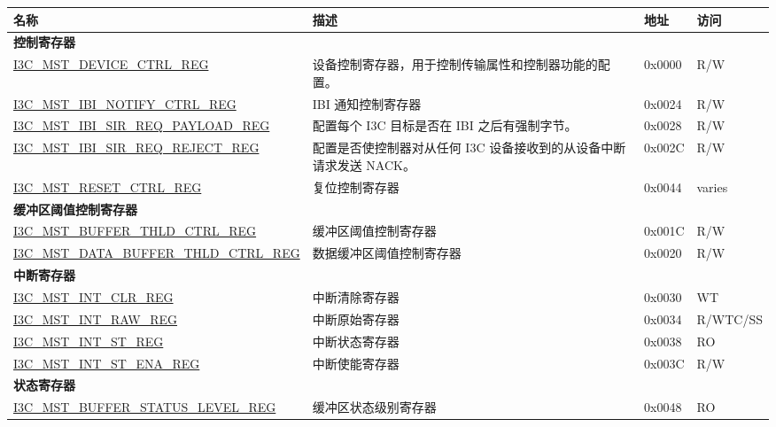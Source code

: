 \begin{longtable}{ | p{7.5cm} | p{6cm} | p{1.3cm} | p{1.5cm} | }
\hline\rowcolor{lightgray}
\textbf{名称} & \textbf{描述} &  \textbf{地址} & \textbf{访问} \\ \hline
\endhead
\multicolumn{4}{|l|}{\textbf{控制寄存器}} \\ \hline
\hyperref[regdesc:I3CMSTDEVICECTRLREG]{I3C\_MST\_DEVICE\_CTRL\_REG} & 设备控制寄存器，用于控制传输属性和控制器功能的配置。 & 0x0000 & R/W \\ \hline
\hyperref[regdesc:I3CMSTIBINOTIFYCTRLREG]{I3C\_MST\_IBI\_NOTIFY\_CTRL\_REG} & IBI 通知控制寄存器 & 0x0024 & R/W \\ \hline
\hyperref[regdesc:I3CMSTIBISIRREQPAYLOADREG]{I3C\_MST\_IBI\_SIR\_REQ\_PAYLOAD\_REG} & 配置每个 I3C 目标是否在 IBI 之后有强制字节。 & 0x0028 & R/W \\ \hline
\hyperref[regdesc:I3CMSTIBISIRREQREJECTREG]{I3C\_MST\_IBI\_SIR\_REQ\_REJECT\_REG} & 配置是否使控制器对从任何 I3C 设备接收到的从设备中断请求发送 NACK。 & 0x002C & R/W \\ \hline
\hyperref[regdesc:I3CMSTRESETCTRLREG]{I3C\_MST\_RESET\_CTRL\_REG} & 复位控制寄存器 & 0x0044 & varies \\ \hline
\multicolumn{4}{|l|}{\textbf{缓冲区阈值控制寄存器}} \\ \hline
\hyperref[regdesc:I3CMSTBUFFERTHLDCTRLREG]{I3C\_MST\_BUFFER\_THLD\_CTRL\_REG} & 缓冲区阈值控制寄存器 & 0x001C & R/W \\ \hline
\hyperref[regdesc:I3CMSTDATABUFFERTHLDCTRLREG]{I3C\_MST\_DATA\_BUFFER\_THLD\_CTRL\_REG} & 数据缓冲区阈值控制寄存器 & 0x0020 & R/W \\ \hline
\multicolumn{4}{|l|}{\textbf{中断寄存器}} \\ \hline
\hyperref[regdesc:I3CMSTINTCLRREG]{I3C\_MST\_INT\_CLR\_REG} & 中断清除寄存器 & 0x0030 & WT \\ \hline
\hyperref[regdesc:I3CMSTINTRAWREG]{I3C\_MST\_INT\_RAW\_REG} & 中断原始寄存器 & 0x0034 & R/WTC/SS \\ \hline
\hyperref[regdesc:I3CMSTINTSTREG]{I3C\_MST\_INT\_ST\_REG} & 中断状态寄存器 & 0x0038 & RO \\ \hline
\hyperref[regdesc:I3CMSTINTSTENAREG]{I3C\_MST\_INT\_ST\_ENA\_REG} & 中断使能寄存器 & 0x003C & R/W \\ \hline
\multicolumn{4}{|l|}{\textbf{状态寄存器}} \\ \hline
\hyperref[regdesc:I3CMSTBUFFERSTATUSLEVELREG]{I3C\_MST\_BUFFER\_STATUS\_LEVEL\_REG} & 缓冲区状态级别寄存器 & 0x0048 & RO \\ \hline

\end{longtable}
